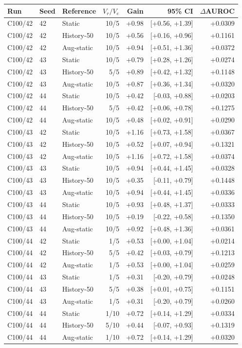 \begin{tabular}{lllrrrr}
\toprule
Run & Seed & Reference & $V_r/V_e$ & Gain & 95\% CI & $\Delta$AUROC \\
\midrule
C100/42 & 42 & Static & 10/5 & +0.98 & [+0.56, +1.39] & +0.0309 \\
C100/42 & 42 & History-50 & 10/5 & +0.56 & [+0.16, +0.96] & +0.1161 \\
C100/42 & 42 & Aug-static & 10/5 & +0.94 & [+0.51, +1.36] & +0.0372 \\
C100/42 & 43 & Static & 10/5 & +0.79 & [+0.28, +1.26] & +0.0274 \\
C100/42 & 43 & History-50 & 5/5 & +0.89 & [+0.42, +1.32] & +0.1148 \\
C100/42 & 43 & Aug-static & 10/5 & +0.87 & [+0.36, +1.34] & +0.0320 \\
C100/42 & 44 & Static & 10/5 & +0.42 & [-0.03, +0.88] & +0.0203 \\
C100/42 & 44 & History-50 & 5/5 & +0.42 & [+0.06, +0.78] & +0.1275 \\
C100/42 & 44 & Aug-static & 10/5 & +0.48 & [+0.02, +0.91] & +0.0290 \\
C100/43 & 42 & Static & 10/5 & +1.16 & [+0.73, +1.58] & +0.0367 \\
C100/43 & 42 & History-50 & 10/5 & +0.52 & [+0.07, +0.94] & +0.1321 \\
C100/43 & 42 & Aug-static & 10/5 & +1.16 & [+0.72, +1.58] & +0.0374 \\
C100/43 & 43 & Static & 10/5 & +0.94 & [+0.44, +1.45] & +0.0328 \\
C100/43 & 43 & History-50 & 10/5 & +0.35 & [-0.11, +0.79] & +0.1448 \\
C100/43 & 43 & Aug-static & 10/5 & +0.94 & [+0.44, +1.45] & +0.0336 \\
C100/43 & 44 & Static & 10/5 & +0.93 & [+0.48, +1.37] & +0.0333 \\
C100/43 & 44 & History-50 & 10/5 & +0.19 & [-0.22, +0.58] & +0.1350 \\
C100/43 & 44 & Aug-static & 10/5 & +0.92 & [+0.48, +1.36] & +0.0361 \\
C100/44 & 42 & Static & 1/5 & +0.53 & [+0.00, +1.04] & +0.0214 \\
C100/44 & 42 & History-50 & 5/5 & +0.42 & [+0.03, +0.79] & +0.1213 \\
C100/44 & 42 & Aug-static & 1/5 & +0.53 & [+0.00, +1.04] & +0.0259 \\
C100/44 & 43 & Static & 1/5 & +0.31 & [-0.20, +0.79] & +0.0248 \\
C100/44 & 43 & History-50 & 5/5 & +0.38 & [+0.01, +0.75] & +0.1151 \\
C100/44 & 43 & Aug-static & 1/5 & +0.31 & [-0.20, +0.79] & +0.0260 \\
C100/44 & 44 & Static & 1/10 & +0.72 & [+0.14, +1.29] & +0.0334 \\
C100/44 & 44 & History-50 & 5/10 & +0.44 & [-0.07, +0.93] & +0.1319 \\
C100/44 & 44 & Aug-static & 1/10 & +0.72 & [+0.14, +1.29] & +0.0320 \\
\bottomrule
\end{tabular}
